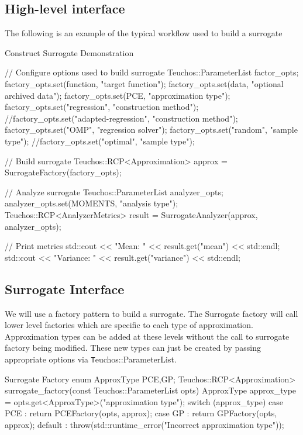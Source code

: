 \documentclass[dakotalogo]{dakota-article}
\begin{document}
\subsection{High-level interface}
The following is an example of the typical workflow used to build a surrogate
\begin{codelisting}[]{Construct Surrogate Demonstration}
  
// Configure options used to build surrogate
Teuchos::ParameterList factor_opts;
factory_opts.set(function, "target function");
factory_opts.set(data, "optional archived data");
factory_opts.set(PCE, "approximation type");
factory_opts.set("regression", "construction method");
//factory_opts.set("adapted-regression", "construction method");
factory_opts.set("OMP", "regression solver");
factory_opts.set("random", "sample type");
//factory_opts.set("optimal", "sample type");

// Build surrogate
Teuchos::RCP<Approximation> approx = SurrogateFactory(factory_opts);

// Analyze surrogate
Teuchos::ParameterList analyzer_opts;
analyzer_opts.set(MOMENTS, "analysis type");
Teuchos::RCP<AnalyzerMetrics> result = SurrogateAnalyzer(approx, analyzer_opts);

// Print metrics
std::cout << "Mean: " << result.get("mean") << std::endl;
std::cout << "Variance: " << result.get("variance") << std::endl;
  
\end{codelisting}

\subsection{Surrogate Interface}
We will use a factory pattern to build a surrogate. The Surrogate factory will call lower level factories which are specific to each type of approximation. Approximation types can be added at these levels without the call to surrogate factory being modified. These new types can just be created by passing appropriate options via {\texttt Teuchos::ParameterList}.
\begin{codelisting}[]{Surrogate Factory}
enum ApproxType {PCE,GP};
Teuchos::RCP<Approximation> surrogate_factory(const Teuchos::ParameterList opts){
  ApproxType approx_type = opts.get<ApproxType>("approximation type");
  switch (approx_type){
    case PCE : {
      return PCEFactory(opts, approx);
    }
    case GP : { 
      return GPFactory(opts, approx);
    }
    default : {
      throw(std::runtime_error("Incorrect approximation type"));
    }
  }
}
\end{codelisting}
\end{document}
